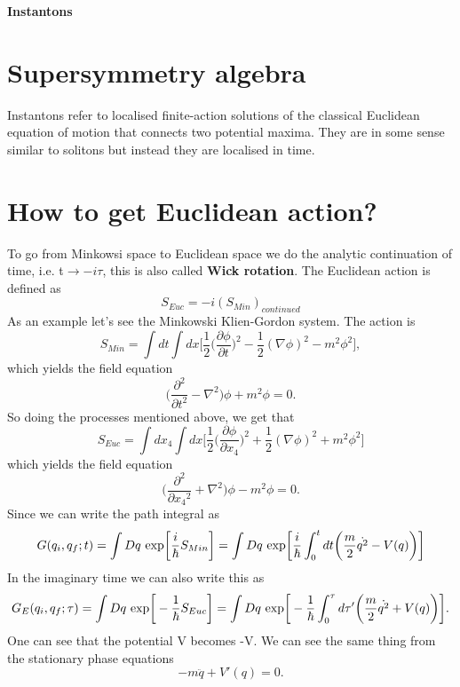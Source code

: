 \documentclass[a4paper, 12pt]{article}
\begin{document}
\begin{center} 
{\Huge{\textbf{Instantons}}}\\
\end{center}

\section {Supersymmetry algebra}
Instantons refer to localised finite-action solutions of the classical Euclidean equation of motion that connects two potential maxima. They are in some sense similar to solitons but instead they are localised in time. 
\section {How to get Euclidean action?}
To go from Minkowsi space to Euclidean space we do the analytic continuation of time, i.e. t$\to -i\tau$, this is also called \textbf{Wick rotation}. The Euclidean action is defined as
\begin{equation}
S_{Euc} = -i(S_{Min})_{continued}
\end{equation}
As an example let's see the Minkowski Klien-Gordon system. The action is 
\begin{equation}
S_{Min} = \int dt \int dx \bigg[\frac{1}{2}\bigg(\frac{\partial\phi}{\partial t} \bigg)^2 - \frac{1}{2}(\nabla \phi)^2 -m^2 \phi^2  \bigg],
\end{equation}
which yields the field equation
\begin{equation}
\bigg( \frac{\partial^2}{\partial t^2} - \nabla^2 \bigg)\phi + m^2\phi = 0.
\end{equation}
So doing the processes mentioned above, we get that
\begin{equation}%
S_{Euc} = \int dx_4 \int dx \bigg[\frac{1}{2}\bigg(\frac{\partial\phi}{\partial x_4} \bigg)^2 + \frac{1}{2}(\nabla \phi)^2 + m^2 \phi^2  \bigg]
\end{equation}
which yields the field equation
\begin{equation}%
\bigg( \frac{\partial^2}{\partial {x_4}^2} + \nabla^2 \bigg)\phi - m^2\phi = 0.
\end{equation}
Since we can write the path integral as
\begin{equation}%
G(q_i,q_f;t) = \int Dq \*\ \textrm{exp}\bigg[\frac{i}{\hbar}S_{Min}\bigg] =  \int Dq \*\ \textrm{exp}\bigg[\frac{i}{\hbar}\int_0^t dt \bigg(\frac{m}{2}\dot{q^2} - V(q) \bigg) \bigg]
\end{equation}
In the imaginary time we can also write this as
\begin{equation}%
G_E(q_i,q_f;\tau) = \int Dq \*\ \textrm{exp}\bigg[-\frac{1}{\hbar}S_{Euc}\bigg] =  \int Dq \*\ \textrm{exp}\bigg[-\frac{1}{\hbar}\int_0^\tau d\tau' \bigg(\frac{m}{2}\dot{q^2} + V(q) \bigg) \bigg].
\end{equation}
One can see that the potential V becomes -V. We can see the same thing from the stationary phase equations
\begin{equation}
-m\ddot{q} + V'(q) = 0.
\end{equation}
\end{document}
